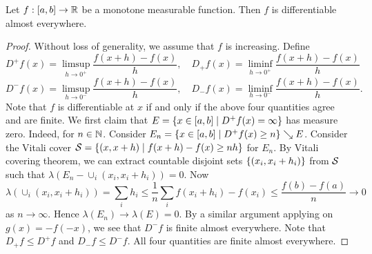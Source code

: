 \begin{theorem}[Lebesgue]
    Let $f:[a,b]\to\R$ be a monotone measurable function. Then $f$ is differentiable 
    almost everywhere. 
\end{theorem}
\begin{proof}
    Without loss of generality, we assume that $f$ is increasing. Define 
    \begin{equation*}
        D^+ f(x) = \limsup_{h\to 0^+}\frac{f(x+h)-f(x)}{h}, \quad 
        D_+ f(x) = \liminf_{h\to 0^+}\frac{f(x+h)-f(x)}{h}
    \end{equation*}
    \begin{equation*}
        D^- f(x) = \limsup_{h\to 0^-}\frac{f(x+h)-f(x)}{h}, \quad 
        D_- f(x) = \liminf_{h\to 0^-}\frac{f(x+h)-f(x)}{h}.
    \end{equation*}
    Note that $f$ is differentiable at $x$ if and only if the above 
    four quantities agree and are finite. We first claim that 
    $E = \Set{x\in [a,b]}{D^+ f(x)=\infty}$ has measure zero. Indeed, 
    for $n\in\N$. Consider $E_n = \Set{x\in [a,b]}{D^+ f(x)\geq n}\searrow E$. 
    Consider the Vitali cover $\S = \Set{(x,x+h)}{f(x+h)-f(x)\geq nh}$ for $E_n$.  
    By Vitali covering theorem, we can extract countable disjoint sets 
    $\set{(x_i,x_i+h_i)}$ from $\S$ such that 
    $\lambda(E_n - \cup_i(x_i,x_i+h_i)) = 0$. Now 
    \begin{equation*}
        \lambda(\cup_i (x_i,x_i+h_i)) = \sum_ih_i
        \leq \frac{1}{n}\sum_i f(x_i+h_i)-f(x_i) 
        \leq \frac{f(b)-f(a)}{n}\to 0  
    \end{equation*}  
    as $n\to\infty$. Hence $\lambda(E_n)\to\lambda(E) = 0$. By a 
    similar argument applying on $g(x) = -f(-x)$, we see that 
    $D^- f$ is finite almost everywhere. Note that $D_+ f\leq D^+ f$ 
    and $D_- f\leq D^- f$. All four quantities are finite almost 
    everywhere.


\end{proof}
